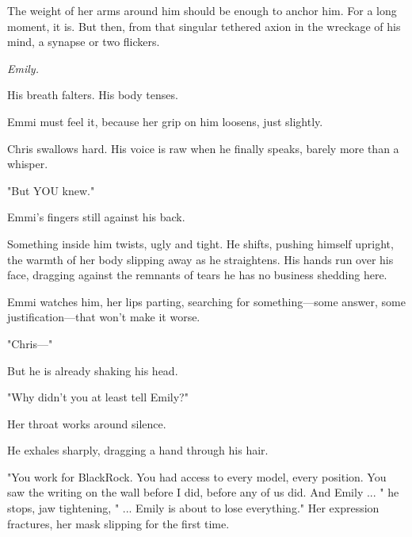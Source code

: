 The weight of her arms around him should be enough to anchor him.  
For a long moment, it is.  But then, from that singular tethered axion in the wreckage of his mind, a synapse or two flickers. \smallskip

\textit{Emily.}  

\smallskip

His breath falters. His body tenses.  

\smallskip

Emmi must feel it, because her grip on him loosens, just slightly.  

\smallskip

Chris swallows hard. His voice is raw when he finally speaks, barely more than a whisper.  

\smallskip

"But YOU knew."

\smallskip

Emmi’s fingers still against his back.  

\smallskip

Something inside him twists, ugly and tight. He shifts, pushing himself upright, the warmth of her body slipping away as he straightens. His hands run over his face, dragging against the remnants of tears he has no business shedding here.  

\smallskip

Emmi watches him, her lips parting, searching for something—some answer, some justification—that won’t make it worse.  

\smallskip

"Chris—"

\smallskip

But he is already shaking his head.  

\smallskip

"Why didn’t you at least tell Emily?"  

\smallskip

Her throat works around silence.  

\smallskip

He exhales sharply, dragging a hand through his hair.  

\smallskip

"You work for BlackRock. You had access to every model, every position. You saw the writing on the wall before I did, before any of us did. And Emily ... " he stops, jaw tightening, " ... Emily is about to lose everything." Her expression fractures, her mask slipping for the first time.  

